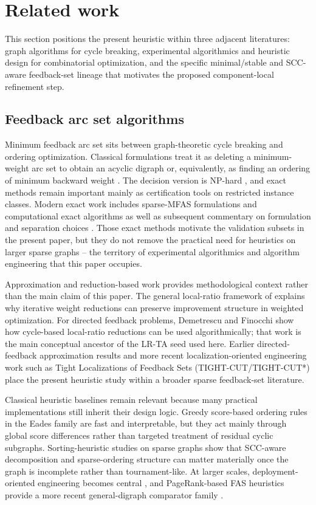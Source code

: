 \section{Related work}
\label{sec:related-work}

This section positions the present heuristic within three adjacent literatures: graph algorithms for cycle breaking, experimental algorithmics and heuristic design for combinatorial optimization, and the specific minimal/stable and SCC-aware feedback-set lineage that motivates the proposed component-local refinement step.

\subsection{Feedback arc set algorithms}

Minimum feedback arc set sits between graph-theoretic cycle breaking and ordering optimization. Classical formulations treat it as deleting a minimum-weight arc set to obtain an acyclic digraph or, equivalently, as finding an ordering of minimum backward weight \cite{LC66,F90}. The decision version is NP-hard \cite{K72}, and exact methods remain important mainly as certification tools on restricted instance classes. Modern exact work includes sparse-MFAS formulations and computational exact algorithms \cite{BSNA21} as well as subsequent commentary on formulation and separation choices \cite{GJR22}. Those exact methods motivate the validation subsets in the present paper, but they do not remove the practical need for heuristics on larger sparse graphs -- the territory of experimental algorithmics and algorithm engineering that this paper occupies.

Approximation and reduction-based work provides methodological context rather than the main claim of this paper. The general local-ratio framework of \cite{BYGR98} explains why iterative weight reductions can preserve improvement structure in weighted optimization. For directed feedback problems, Demetrescu and Finocchi \cite{DF03} show how cycle-based local-ratio reductions can be used algorithmically; that work is the main conceptual ancestor of the LR-TA seed used here. Earlier directed-feedback approximation results \cite{ENSS98} and more recent localization-oriented engineering work such as Tight Localizations of Feedback Sets (TIGHT-CUT/TIGHT-CUT*) \cite{HGH21} place the present heuristic study within a broader sparse feedback-set literature.

Classical heuristic baselines remain relevant because many practical implementations still inherit their design logic. Greedy score-based ordering rules in the Eades family \cite{ELS93,EL95} are fast and interpretable, but they act mainly through global score differences rather than targeted treatment of residual cyclic subgraphs. Sorting-heuristic studies on sparse graphs \cite{BH11TR,BH13,Hanauer2017thesis} show that SCC-aware decomposition and sparse-ordering structure can matter materially once the graph is incomplete rather than tournament-like. At larger scales, deployment-oriented engineering becomes central \cite{SST16}, and PageRank-based FAS heuristics provide a more recent general-digraph comparator family \cite{GLT23}.

